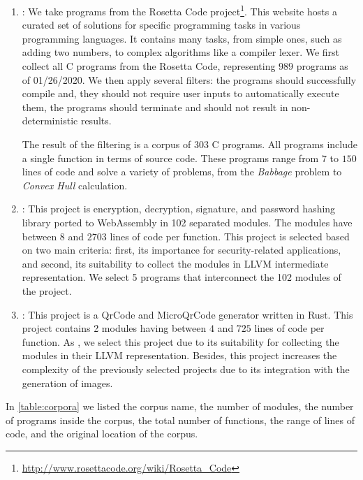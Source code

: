 \begin{enumerate}
    \item \textbf{\corpusrosetta}: We take programs from the  Rosetta Code project\footnote{\url{http://www.rosettacode.org/wiki/Rosetta_Code}}. This website hosts a curated set of solutions for specific programming tasks in various programming languages. It contains many tasks, from simple ones, such as adding two numbers, to complex algorithms like a compiler lexer. We first collect all C programs from the Rosetta Code, representing $989$ programs as of 01/26/2020. We then apply several filters: the programs should successfully compile and, they should not require user inputs to automatically execute them, the programs should terminate and should not result in non-deterministic results. 
    
    The result of the filtering is a corpus of 303 C programs. All programs include a single function in terms of source code. These programs range from $7$ to $150$ lines of code and solve a variety of problems, from the \textit{Babbage} problem to  \textit{Convex Hull} calculation.

    \item \textbf{\corpussodium}: This project is encryption, decryption, signature, and password hashing library ported to WebAssembly in 102 separated modules. The modules have between $8$ and $2703$ lines of code per function. This project is selected based on two main criteria: first, its importance for security-related applications, and second, its suitability to collect the modules in LLVM intermediate representation. We select 5 programs that interconnect the 102 modules of the project.

    \item \textbf{\corpusqrcode}: This project is a QrCode and MicroQrCode generator written in Rust. This project contains 2 modules having between $4$ and $725$ lines of code per function. As \corpussodium, we select this project due to its suitability for collecting the modules in their LLVM representation. Besides, this project increases the complexity of the previously selected projects due to its integration with the generation of images.
    
\end{enumerate}

In \autoref{table:corpora} we listed the corpus name, the number of modules, the number of programs inside the corpus, the total number of functions, the range of lines of code, and the original location of the corpus. 


